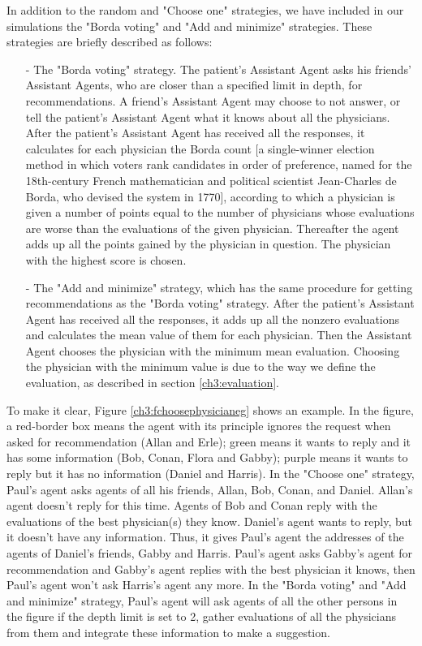 In addition to the random and "Choose one" strategies, we have included in our simulations the "Borda voting" and "Add and minimize" strategies. These strategies are briefly described as follows:
\begin{itemize}
\item[-]The "Borda voting" strategy. The patient's Assistant Agent asks his friends' Assistant Agents, who are closer than a specified limit in depth, for recommendations. A friend's Assistant Agent may choose to not answer, or tell the patient's Assistant Agent what it knows about all the physicians. After the patient's Assistant Agent has received all the responses, it calculates for each physician the Borda count [a single-winner election method in which voters rank candidates in order of preference, named for the 18th-century French mathematician and political scientist Jean-Charles de Borda, who devised the system in 1770], according to which a physician is given a number of points equal to the number of physicians whose evaluations are worse than the evaluations of the given physician. Thereafter the agent adds up all the points gained by the physician in question. The physician with the highest score is chosen.
\item[-]The "Add and minimize" strategy, which has the same procedure for getting recommendations as the "Borda voting" strategy. After the patient's Assistant Agent has received all the responses, it adds up all the nonzero evaluations and calculates the mean value of them for each physician. Then the Assistant Agent chooses the physician with the minimum mean evaluation. Choosing the physician with the minimum value is due to the way we define the evaluation, as described in section \ref{ch3:evaluation}.
\end{itemize}

To make it clear, Figure \ref{ch3:fchoosephysicianeg} shows an example. In the figure, a red-border box means the agent with its principle ignores the request when asked for recommendation (Allan and Erle); green means it wants to reply and it has some information (Bob, Conan, Flora and Gabby); purple means it wants to reply but it has no information (Daniel and Harris). In the "Choose one" strategy, Paul's agent asks agents of all his friends, Allan, Bob, Conan, and Daniel. Allan's agent doesn't reply for this time. Agents of Bob and Conan reply with the evaluations of the best physician(s) they know. Daniel's agent wants to reply, but it doesn't have any information. Thus, it gives Paul's agent the addresses of the agents of Daniel's friends, Gabby and Harris. Paul's agent asks Gabby's agent for recommendation and Gabby's agent replies with the best physician it knows, then Paul's agent won't ask Harris's agent any more. In the "Borda voting" and "Add and minimize" strategy, Paul's agent will ask agents of all the other persons in the figure if the depth limit is set to 2, gather evaluations of all the physicians from them and integrate these information to make a suggestion. 

